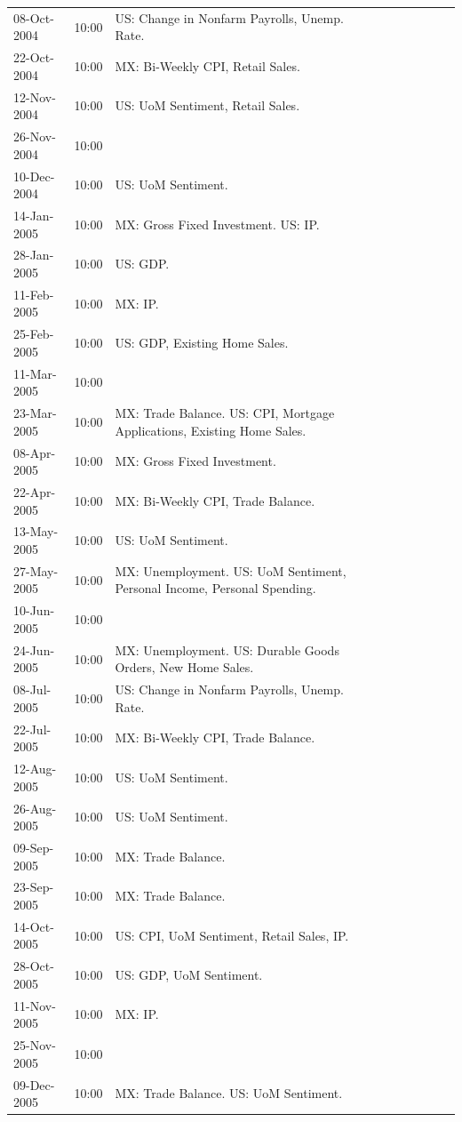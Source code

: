 \documentclass[a4paper,12pt]{article} 		%
\begin{document}
\begin{tiny}
\begin{center}
\begin{longtable}{p{1.8cm}p{1cm}p{11.7cm}p{1.8cm}p{1cm}p{11.7cm}p{1.8cm}p{1cm}p{11.7cm}}
			08-Oct-2004 & 10:00 & US: Change in Nonfarm Payrolls, Unemp. Rate. \\
			22-Oct-2004 & 10:00 & MX: Bi-Weekly CPI, Retail Sales. \\
			12-Nov-2004 & 10:00 & US: UoM Sentiment, Retail Sales. \\
			26-Nov-2004 & 10:00 &  \\
			10-Dec-2004 & 10:00 & US: UoM Sentiment. \\
			14-Jan-2005 & 10:00 & MX: Gross Fixed Investment. US: IP. \\
			28-Jan-2005 & 10:00 & US: GDP. \\
			11-Feb-2005 & 10:00 & MX: IP. \\
			25-Feb-2005 & 10:00 & US: GDP, Existing Home Sales. \\
			11-Mar-2005 & 10:00 &  \\
			23-Mar-2005 & 10:00 & MX: Trade Balance. US: CPI, Mortgage Applications, Existing Home Sales. \\
			08-Apr-2005 & 10:00 & MX: Gross Fixed Investment. \\
			22-Apr-2005 & 10:00 & MX: Bi-Weekly CPI, Trade Balance. \\
			13-May-2005 & 10:00 & US: UoM Sentiment. \\
			27-May-2005 & 10:00 & MX: Unemployment. US: UoM Sentiment, Personal Income, Personal Spending. \\
			10-Jun-2005 & 10:00 &  \\
			24-Jun-2005 & 10:00 & MX: Unemployment. US: Durable Goods Orders, New Home Sales. \\
			08-Jul-2005 & 10:00 & US: Change in Nonfarm Payrolls, Unemp. Rate. \\
			22-Jul-2005 & 10:00 & MX: Bi-Weekly CPI, Trade Balance. \\
			12-Aug-2005 & 10:00 & US: UoM Sentiment. \\
			26-Aug-2005 & 10:00 & US: UoM Sentiment. \\
			09-Sep-2005 & 10:00 & MX: Trade Balance. \\
			23-Sep-2005 & 10:00 & MX: Trade Balance. \\
			14-Oct-2005 & 10:00 & US: CPI, UoM Sentiment, Retail Sales, IP. \\
			28-Oct-2005 & 10:00 & US: GDP, UoM Sentiment. \\
			11-Nov-2005 & 10:00 & MX: IP. \\
			25-Nov-2005 & 10:00 &  \\
			09-Dec-2005 & 10:00 & MX: Trade Balance. US: UoM Sentiment. \\

\end{longtable}
\end{center}
\end{tiny}
\end{document}
